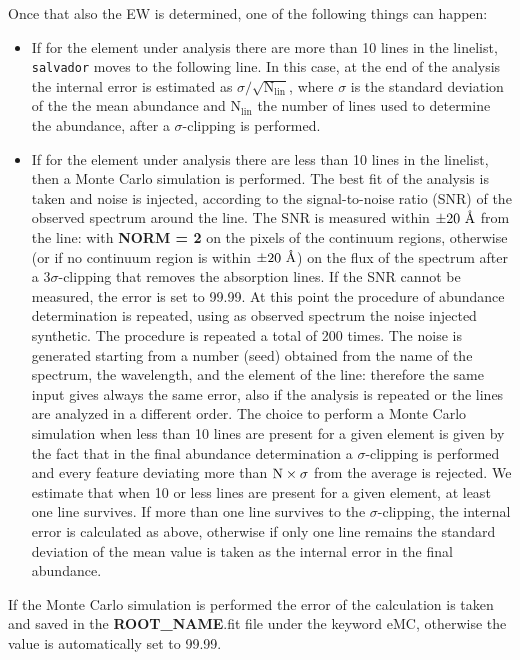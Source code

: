 \documentclass[modern]{aastex701}
\newcommand{\angstrom}{\mbox{\normalfont\AA}}
\begin{document}
Once that also the EW is determined, one of the following things can happen:
\begin{itemize}
    \item If for the element under analysis there are more than 10 lines in the linelist, \texttt{salvador} moves to the following line. In this case, at the end of the analysis the internal error is estimated as $\sigma / \sqrt{\mathrm{N_{lin}}}$, where $\sigma$ is the standard deviation of the the mean abundance and $\mathrm{N_{lin}}$ the number of lines used to determine the abundance, after a $\sigma$-clipping is performed.     
    \item If for the element under analysis there are less than 10 lines in the linelist, then a Monte Carlo simulation is performed. The best fit of the analysis is taken and noise is injected, according to the signal-to-noise ratio (SNR) of the observed spectrum around the line. The SNR is measured within $\pm 20~\angstrom$ from the line: with {\bf NORM = 2} on the pixels of the continuum regions, otherwise (or if no continuum region is within $\pm 20~\angstrom$) on the flux of the spectrum after a 3$\sigma$-clipping that removes the absorption lines. If the SNR cannot be measured, the error is set to 99.99. At this point the procedure of abundance determination is repeated, using as observed spectrum the noise injected synthetic. The procedure is repeated a total of 200 times. The noise is generated starting from a number (seed) obtained from the name of the spectrum, the wavelength, and the element of the line: therefore the same input gives always the same error, also if the analysis is repeated or the lines are analyzed in a different order. The choice to perform a Monte Carlo simulation when less than 10 lines are present for a given element is given by the fact that in the final abundance determination a $\sigma$-clipping is performed and every feature deviating more than $\rm N\times\sigma$ from the average is rejected. We estimate that when 10 or less lines are present for a given element, at least one line survives. If more than one line survives to the $\sigma$-clipping, the internal error is calculated as above, otherwise if only one line remains the standard deviation of the mean value is taken as the internal error in the final abundance.    
\end{itemize}

If the Monte Carlo simulation is performed the error of the calculation is taken and saved in the {\bf ROOT\_NAME}.fit file under the keyword {eMC}, otherwise the value is automatically set to 99.99. 
\end{document}
